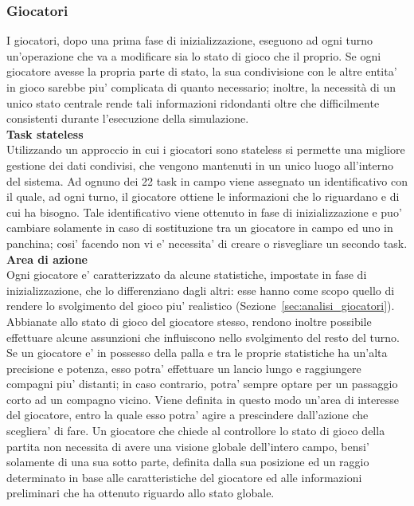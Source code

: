 \subsubsection{Giocatori}
\label{sec:analisi_concorrenza_giocatori}

I giocatori, dopo una prima fase di inizializzazione, eseguono ad ogni turno un'operazione che va a modificare sia lo stato di gioco che il proprio. Se ogni giocatore avesse la propria parte di stato, la sua condivisione con le altre entita' in gioco sarebbe piu' complicata di quanto necessario; inoltre, la necessità di un unico stato centrale rende tali informazioni ridondanti oltre che difficilmente consistenti durante l'esecuzione della simulazione.\\

\textbf{Task stateless}\\

Utilizzando un approccio in cui i giocatori sono stateless si permette una migliore gestione dei dati condivisi, che vengono mantenuti in un unico luogo all'interno del sistema. Ad ognuno dei 22 task in campo viene assegnato un identificativo con il quale, ad ogni turno, il giocatore ottiene le informazioni che lo riguardano e di cui ha bisogno. Tale identificativo viene ottenuto in fase di inizializzazione e puo' cambiare solamente in caso di sostituzione tra un giocatore in campo ed uno in panchina; cosi' facendo non vi e' necessita' di creare o risvegliare un secondo task.\\

\textbf{Area di azione}\\

Ogni giocatore e' caratterizzato da alcune statistiche, impostate in fase di inizializzazione, che lo differenziano dagli altri: esse hanno come scopo quello di rendere lo svolgimento del gioco piu' realistico (Sezione~\ref{sec:analisi_giocatori}). Abbianate allo stato di gioco del giocatore stesso, rendono inoltre possibile effettuare alcune assunzioni che influiscono nello svolgimento del resto del turno.\\

Se un giocatore e' in possesso della palla e tra le proprie statistiche ha un'alta precisione e potenza, esso potra' effettuare un lancio lungo e raggiungere compagni piu' distanti; in caso contrario, potra' sempre optare per un passaggio corto ad un compagno vicino. Viene definita in questo modo un'area di interesse del giocatore, entro la quale esso potra' agire a prescindere dall'azione che scegliera' di fare. Un giocatore che chiede al controllore lo stato di gioco della partita non necessita di avere una visione globale dell'intero campo, bensi' solamente di una sua sotto parte, definita dalla sua posizione ed un raggio determinato in base alle caratteristiche del giocatore ed alle informazioni preliminari che ha ottenuto riguardo allo stato globale.\\

